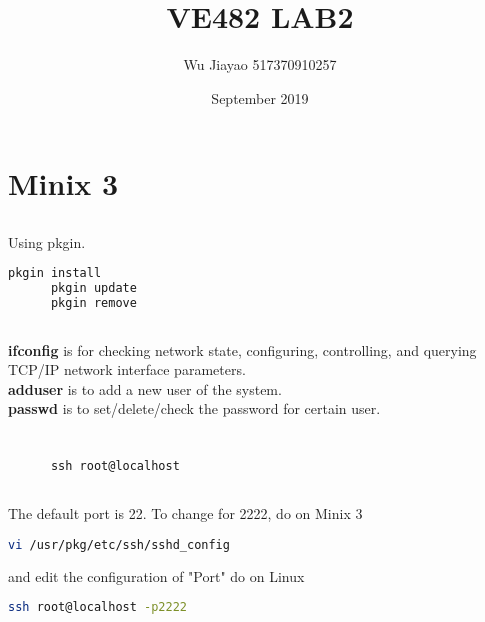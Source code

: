 \documentclass[12pt,a4paper]{article}
\title{VE482 LAB2}
\author{Wu Jiayao 517370910257 }
\date{September 2019}
\theoremstyle{definition}
\begin{document}
\maketitle
\section{Minix 3}
\subsection{}
  Using pkgin.
  \begin{lstlisting}[language=sh]
      pkgin install
      pkgin update
      pkgin remove
  \end{lstlisting}
\subsection{}
  \textbf{ifconfig} is for checking network state, configuring, controlling, and querying TCP/IP network interface parameters. \\
  \textbf{adduser} is to add a new user of the system. \\ 
  \textbf{passwd} is to set/delete/check the password for certain user.
\section{}
\subsection{}
    \begin{lstlisting}
      ssh root@localhost
    \end{lstlisting}
\subsection{}
    The default port is 22.
    To change for 2222, do on Minix 3
    \begin{lstlisting}[language=sh]
        vi /usr/pkg/etc/ssh/sshd_config
    \end{lstlisting}
    and edit the configuration of "Port"
    do on Linux
    \begin{lstlisting}[language=sh]
        ssh root@localhost -p2222
    \end{lstlisting}
\end{document}
